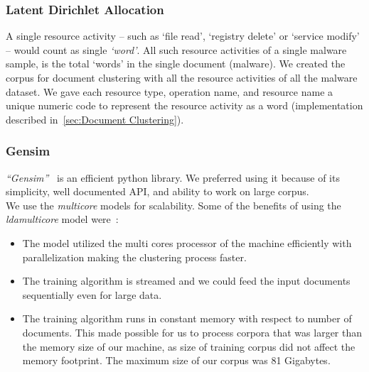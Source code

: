 \subsubsection{Latent Dirichlet Allocation}
\label{ssub:Latent Dirichlet Allocation}
A single resource activity -- such as `file read', `registry delete' or `service modify' -- would count as single \emph{`word'}.
All such resource activities of a single malware sample, is the total `words' in the single document (malware).
We created the corpus for document clustering with all the resource activities of all the malware dataset.
We gave each resource type, operation name, and resource name a unique numeric code to represent the resource activity as a word (implementation described in~\autoref{sec:Document Clustering}).
\subsubsection{Gensim}
\label{ssub:Gensim}
\emph{``Gensim''}~\cite[]{gensim} is an efficient python library.
We preferred using it because of its simplicity, well documented API, and ability to work on large corpus.\\
We use the \emph{multicore}\cite[]{ldamulticore}  models for scalability.
Some of the benefits of using the \emph{ldamulticore} model were~\cite[]{ldamulticore}:
\begin{itemize}
\item The model utilized the multi cores processor of the machine efficiently with parallelization making the clustering process faster.
\item The training algorithm is streamed and we could feed the input documents sequentially even for large data.
\item The training algorithm runs in constant memory with respect to number of documents.
This made possible for us to process corpora that was larger than the memory size of our machine, as size of training corpus did not affect the memory footprint.
The maximum size of our corpus was 81 Gigabytes.

\end{itemize}
